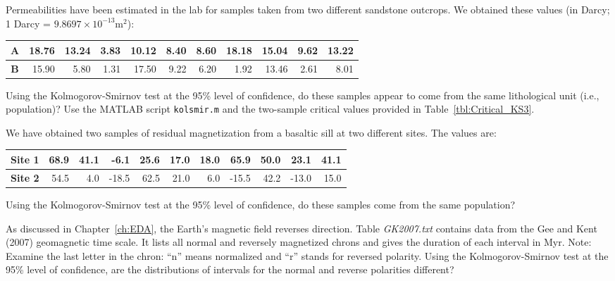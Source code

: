 \begin{problem}
Permeabilities have been estimated in the lab for samples taken from two different
sandstone outcrops.  We obtained these values (in Darcy; 1 Darcy = $9.8697\times10^{-13}\mbox{m}^2$):

\begin{table}[H]
\centering
\begin{tabular}{|c||r|r|r|r|r|r|r|r|r|r|} \hline
\bf{A} & 18.76 & 13.24 & 3.83 & 10.12 & 8.40 & 8.60 & 18.18 & 15.04 & 9.62 & 13.22 \\ \hline
\bf{B} & 15.90 & 5.80 & 1.31 & 17.50 & 9.22 & 6.20 & 1.92 & 13.46 & 2.61 & 8.01 \\ \hline
\end{tabular}
\end{table}

Using the Kolmogorov-Smirnov test at the 95\% level of confidence, do these samples appear to come from the same
lithological unit (i.e., population)?  Use the MATLAB script \texttt{kolsmir.m} and the two-sample critical
values provided in Table~\ref{tbl:Critical_KS3}.
\end{problem}

\begin{problem}
We have obtained two samples of residual magnetization from a basaltic sill at two different sites.  The values are:
\begin{table}[H]
\centering
\begin{tabular}{|c||r|r|r|r|r|r|r|r|r|r|} \hline
\bf{Site 1} & 68.9 & 41.1 & -6.1  & 25.6 & 17.0 & 18.0 &  65.9 & 50.0 &  23.1 & 41.1 \\ \hline
\bf{Site 2} & 54.5 &  4.0 & -18.5 & 62.5 & 21.0 &  6.0 & -15.5 & 42.2 & -13.0 & 15.0 \\ \hline
\end{tabular}
\end{table}
Using the Kolmogorov-Smirnov test at the 95\% level of confidence, do these samples come from the same population?
\end{problem}

\begin{problem}
As discussed in Chapter~\ref{ch:EDA}, the Earth's magnetic field reverses direction. Table \emph{GK2007.txt} contains data from the
Gee and Kent (2007) geomagnetic time scale. It lists all normal and reversely magnetized chrons and gives the duration
of each interval in Myr.  Note: Examine the last letter in the chron: ``n'' means normalized and ``r'' stands for reversed polarity.
Using the Kolmogorov-Smirnov test at the 95\% level of confidence, are the distributions of intervals for the normal and
reverse polarities different?
\end{problem}


